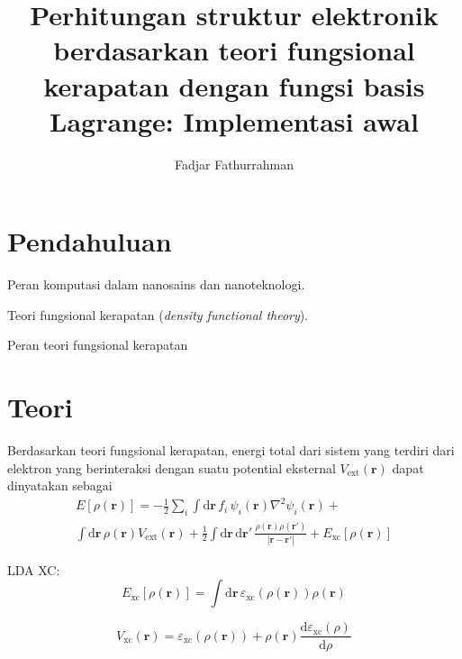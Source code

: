 \documentclass[%
reprint,
amsmath,
amssymb,
aps,
]{revtex4-1}
\begin{document}
\title{Perhitungan struktur elektronik berdasarkan teori fungsional
    kerapatan dengan fungsi basis Lagrange: Implementasi awal}
\author{Fadjar Fathurrahman}
\maketitle

\section{Pendahuluan}

Peran komputasi dalam nanosains dan nanoteknologi.

Teori fungsional kerapatan (\emph{density functional theory}).

Peran teori fungsional kerapatan

\section{Teori}

Berdasarkan teori fungsional kerapatan,
energi total dari sistem yang terdiri dari elektron yang berinteraksi
dengan suatu potential eksternal $V_{\mathrm{ext}}(\mathbf{r})$
dapat dinyatakan sebagai
\begin{multline}
E[\rho(\mathbf{r})] = 
-\frac{1}{2}\sum_{i}
\int\mathrm{d}\mathbf{r}\,
f_{i} \, \psi_{i}(\mathbf{r}) \nabla^2 \psi_{i}(\mathbf{r}) +
\\
\int\mathrm{d}\mathbf{r}\,
\rho(\mathbf{r}) V_{\mathrm{ext}}(\mathbf{r}) +
\frac{1}{2}\int\mathrm{d}\mathbf{r}\,\mathrm{d}\mathbf{r}'\,
\frac{\rho(\mathbf{r})\rho(\mathbf{r}')}{\left|\mathbf{r}-\mathbf{r}'\right|} +
E_{\mathrm{xc}}[\rho(\mathbf{r})]
\end{multline}

LDA XC:
\begin{equation}
E_{\mathrm{xc}}[\rho(\mathbf{r})] =
\int\mathrm{d}\mathbf{r}\,
\varepsilon_{\mathrm{xc}}(\rho(\mathbf{r}))
\rho(\mathbf{r})
\end{equation}

\begin{equation}
V_{\mathrm{xc}}(\mathbf{r}) = \varepsilon_{\mathrm{xc}}(\rho(\mathbf{r}))
+ \rho(\mathbf{r})\frac{\mathrm{d}\varepsilon_{\mathrm{xc}}(\rho)}{\mathrm{d}\rho}
\end{equation}
\end{document}
